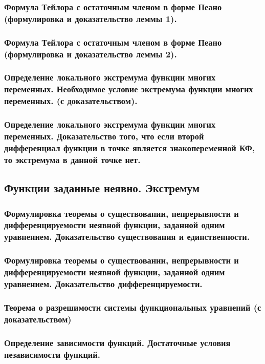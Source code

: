 \documentclass[10pt]{article}
\begin{document}
    \subsubsection{Формула Тейлора с остаточным членом в форме Пеано (формулировка и доказательство леммы 1).}
    \subsubsection{Формула Тейлора с остаточным членом в форме Пеано (формулировка и доказательство леммы 2).}
    \subsubsection{Определение локального экстремума функции многих переменных. Необходимое условие экстремума функции многих переменных. (с доказательством).}
    \subsubsection{Определение локального экстремума функции многих переменных. Доказательство того, что если второй дифференциал функции в точке является знакопеременной КФ, то экстремума в данной точке нет.}
    \subsection{Функции заданные неявно. Экстремум}
    \subsubsection{Формулировка теоремы о существовании, непрерывности и дифференцируемости неявной функции, заданной одним уравнением. Доказательство существования и единственности.}
    \subsubsection{Формулировка теоремы о существовании, непрерывности и дифференцируемости неявной функции, заданной одним уравнением. Доказательство дифференцируемости.}
    \subsubsection{Теорема о разрешимости системы функциональных уравнений (с доказательством)}
    \subsubsection{Определение зависимости функций. Достаточные условия независимости функций.}
\end{document}
